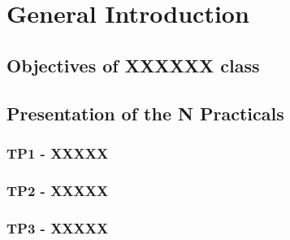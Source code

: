 \section{General Introduction}
\label{sec:Intro}

\subsection{Objectives of XXXXXX class}

\lipsum[1]

\subsection{Presentation of the N Practicals}
    \subsubsection{TP1 - XXXXX}
    
    \lipsum[1]

    \subsubsection{TP2 - XXXXX}
    
    \lipsum[1]

    \subsubsection{TP3 - XXXXX}
    
    \lipsum[1]